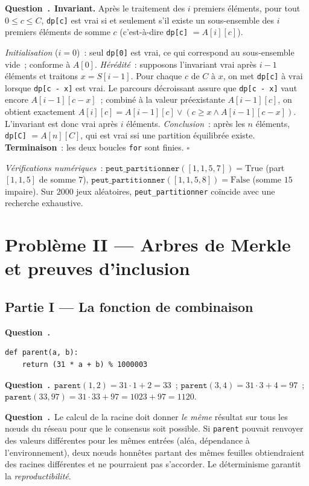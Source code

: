 \documentclass[11pt,a4paper]{article}
\newcounter{qcnt}
\newcommand{\Q}{\medskip\par\stepcounter{qcnt}\noindent\textbf{Question~\theqcnt.}~}
\newcommand{\code}[1]{\lstinline!#1!}
\begin{document}
\Q \textbf{Invariant.} Après le traitement des $i$ premiers éléments, pour tout
$0 \le c \le C$, \code{dp[c]} est vrai si et seulement s'il existe un sous-ensemble des $i$
premiers éléments de somme $c$ (c'est-à-dire \code{dp[c]} $= A[i][c]$).

\noindent\emph{Initialisation} ($i=0$)~: seul \code{dp[0]} est vrai, ce qui correspond au
sous-ensemble vide~; conforme à $A[0]$. \emph{Hérédité}~: supposons l'invariant vrai après $i-1$
éléments et traitons $x = S[i-1]$. Pour chaque $c$ de $C$ à $x$, on met \code{dp[c]} à vrai
lorsque \code{dp[c - x]} est vrai. Le parcours décroissant assure que \code{dp[c - x]} vaut encore
$A[i-1][c-x]$~; combiné à la valeur préexistante $A[i-1][c]$, on obtient exactement
$A[i][c] = A[i-1][c] \lor (c \ge x \land A[i-1][c-x])$. L'invariant est donc vrai après $i$
éléments. \emph{Conclusion}~: après les $n$ éléments, \code{dp[C]} $= A[n][C]$, qui est vrai ssi
une partition équilibrée existe. \textbf{Terminaison}~: les deux boucles \code{for} sont finies.
$\square$

\medskip
\noindent\emph{Vérifications numériques}~: $\mathtt{peut\_partitionner}([1,1,5,7]) = \text{True}$
(part $[1,1,5]$ de somme $7$), $\mathtt{peut\_partitionner}([1,1,5,8]) = \text{False}$ (somme
$15$ impaire). Sur $2000$ jeux aléatoires, \code{peut_partitionner} coïncide avec une recherche
exhaustive.

\clearpage
\section*{Problème II --- Arbres de Merkle et preuves d'inclusion}
\subsection*{Partie I --- La fonction de combinaison}

\Q
\begin{lstlisting}
def parent(a, b):
    return (31 * a + b) % 1000003
\end{lstlisting}

\Q $\mathtt{parent}(1,2) = 31\cdot1+2 = 33$~; $\mathtt{parent}(3,4)=31\cdot3+4=97$~;
$\mathtt{parent}(33,97)=31\cdot33+97=1023+97=1120$.

\Q Le calcul de la racine doit donner \emph{le même} résultat sur tous les n\oe uds du réseau
pour que le consensus soit possible. Si \code{parent} pouvait renvoyer des valeurs différentes
pour les mêmes entrées (aléa, dépendance à l'environnement), deux n\oe uds honnêtes partant des
mêmes feuilles obtiendraient des racines différentes et ne pourraient pas s'accorder. Le
déterminisme garantit la \emph{reproductibilité}.
\end{document}
